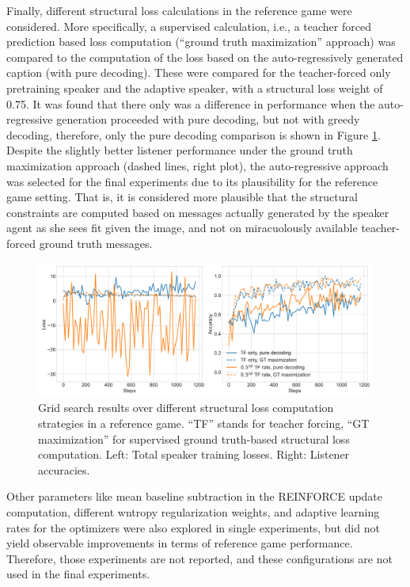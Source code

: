 Finally, different structural loss calculations in the reference game were considered. More specifically, a supervised calculation, i.e., a teacher forced prediction  based loss computation (``ground truth maximization'' approach)  was compared to the computation of the loss based on the auto-regressively generated caption (with pure decoding). These were compared for the teacher-forced only pretraining speaker and the adaptive speaker, with a structural loss weight of 0.75.
It was found that there only was a difference in performance when the auto-regressive generation proceeded with pure decoding, but not with greedy decoding, therefore, only the pure decoding comparison is shown in Figure \ref{fig:coco_grid_Ls_calc}. Despite the slightly better listener performance under the ground truth maximization approach (dashed lines, right plot), the auto-regressive approach was selected for the final experiments due to its plausibility for the reference game setting. That is, it is considered more plausible that the structural constraints are computed based on messages actually generated by the speaker agent as she sees fit given the image, and not on miracuolously available teacher-forced ground truth messages. 

\begin{figure}
	\centering
	\includegraphics[width=\linewidth]{images/grid_search_Ls_calculation.png}
	\caption{Grid search results over different structural loss computation strategies in a reference game. ``TF'' stands for teacher forcing, ``GT maximization'' for supervised ground truth-based structural loss computation. Left: Total speaker training losses. Right: Listener accuracies.}
	\label{fig:coco_grid_Ls_calc}
\end{figure}

Other parameters like mean baseline subtraction in the REINFORCE update computation, different wntropy regularization weights, and adaptive learning rates for the optimizers were also explored in single experiments, but did not yield observable improvements in terms of reference game performance. Therefore, those experiments are not reported, and these configurations are not used in the final experiments.